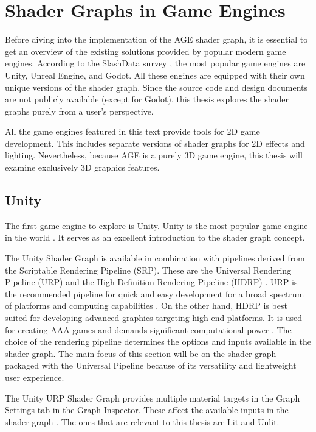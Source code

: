 \documentclass[
  digital,     %
  oneside,     %
  nosansbold,  %
  nocolorbold, %
  lof,         %
  lot,         %
]{fithesis4}
\begin{document}
\section{Shader Graphs in Game Engines}
Before diving into the implementation of the AGE shader graph, it is essential to get an overview of the existing solutions
provided by popular modern game engines. According to the SlashData survey \cite{slashdata-game-engines},
the most popular game engines are Unity, Unreal Engine, and Godot. All these engines are equipped with
their own unique versions of the shader graph. Since the source code and design documents are not publicly
available (except for Godot), this thesis explores the shader graphs purely from a user's perspective.

All the game engines featured in this text provide tools for 2D game development. This includes separate versions
of shader graphs for 2D effects and lighting. Nevertheless, because AGE is a purely 3D game engine, this thesis
will examine exclusively 3D graphics features.

\subsection{Unity}
The first game engine to explore is Unity. Unity is the most popular game engine in the world \cite{slashdata-game-engines}.
It serves as an excellent introduction to the shader graph concept.

The Unity Shader Graph is available in combination with pipelines derived from the Scriptable Rendering Pipeline (SRP).
These are the Universal Rendering Pipeline (URP) and the High Definition Rendering Pipeline (HDRP) \cite{unity-srp}.
URP is the recommended pipeline for quick and easy development for a broad spectrum of platforms and computing capabilities
\cite{unity-urp}. On the other hand, HDRP is best suited for developing advanced graphics targeting high-end platforms.
It is used for creating AAA games and demands significant computational power \cite{unity-hdrp}.
The choice of the rendering pipeline determines the options and inputs available in the shader graph.
The main focus of this section will be on the shader graph packaged with the Universal Pipeline because of its versatility
and lightweight user experience.

The Unity URP Shader Graph provides multiple material targets in the Graph Settings tab in the Graph Inspector.
These affect the available inputs in the shader graph \cite{unity-graph-settings}. The ones that are relevant
to this thesis are Lit and Unlit.
\end{document}

